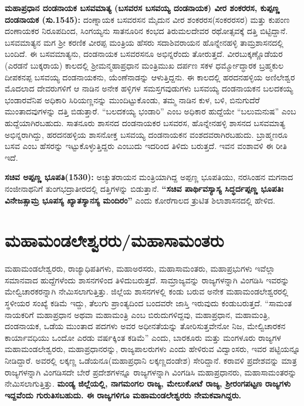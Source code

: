 \textbf{ಮಹಾಪ್ರಧಾನ ದಂಡನಾಯಕ ಬಸವಮಾತ್ಯ (ಬಸವರಸ \general{\enginline{-}} ಬಸವಯ್ಯ ದಂಡನಾಯಕ) ವೀರ ಶಂಕರರಸ, ಕುಪ್ಪಣ್ಣ ದಂಡನಾಯಕ (ಸು.1545):} ದಂಣ್ನಾಯಕ ಬಸವರಸನ ಮೈದುನ ವೀರ ಶಂಕರರಸ(ಸಂಕರರಸರ) ಮತ್ತು ಕುಪಂಣ ದಂಣಾಯಕರ ನಿರೂಪದಿಂದ, ಸಿಂಗಯ್ಯನು ಸಾತನೂರಿನ ಕಂಭದ ತಿರುಮಲದೇವರ ರಥೋತ್ಸವಕ್ಕೆ ದತ್ತಿ ಬಿಟ್ಟಿದ್ದಾನೆ. ಬಸವಮಾತ್ಯನ ಮಗ ಶ‍್ರೀ ಕರಣಿಕ ವೀರಪ್ಪ ಮಂತ್ರಿಯ ಹೆಸರು ಸದಾಶಿವರಾಯನ ಹೊನ್ನೇನಹಳ್ಳಿ ತಾಮ್ರಶಾಸನದಲ್ಲಿ ಬಂದಿದೆ. ಈ ಬಸವಮಾತ್ಯನು, ದಂಡನಾಯಕ ಬಸವರಸನೂ ಅಭಿನ್ನರೆಂದು ತೋರುತ್ತದೆ. ವೀರಬುಕ್ಕಣ್ಣೊಡೆಯರ (ಎರಡನೆ ಬುಕ್ಕರಾಯ) ಕಾಲದಲ್ಲಿ ಶ‍್ರೀಮನ್ಮಹಾಪ್ರಧಾನ ಮಂತ್ರಿಮುಖ ದರ್ಪಣ ಸಕಳ ಧರ್ಮ್ಮೋದ್ಧಾರಕ ಬ್ರಹ್ಮಕುಲ ದೀಪಕನಪ್ಪ ಬಸವಯ್ಯ ದಂಡನಾಯಕನು, ಯೆಂಣೆನಾಡನ್ನು ಆಳುತ್ತಿದ್ದನು. ಈ ಕಾಲದಲ್ಲಿ ಹರದನಹಳ್ಳಿಯ ಅಣಿಲೇಶ್ವರ ಮೊದಲಾದ ದೇವರುಗಳಿಗೆ ಆ ನಾಡಿನ ಅನೇಕ ಹಳ್ಳಿಗಳ ಸಮಸ್ತಗವುಡುಗಳು ಬಸವಯ್ಯ ದಂಡನಾಯಕನ ಬಲದಕಯ್ಯ ಭಂಡಾರವೆನಿಪ ಅಧಿಕಾರಿ ಸಿರಿಯಣ್ಣನನ್ನು ಮುಂದಿಟ್ಟುಕೊಂಡು, ತಮ್ಮ ನಾಡಿನ ಕುಳ, ಬಳಿ, ಬಿನುಗುದೆರೆ ಮುಂತಾದವುಗಳನ್ನು ದತ್ತಿ ಬಿಡುತ್ತಾರೆ. “ಬಲದಕಯ್ಯ ಭಂಡಾರಿ” ಎಂಬ ಅಧಿಕಾರ ಹುದ್ದೆಯೇ “ಬಲುಮನುಷ” ಎಂಬ ಹುದ್ದೆಯಾಗಿರಬಹುದು. ಸಾತನೂರು ಶಾಸನದ ದಂಡನಾಯಕರ ಬಸವರಸ, ಹೊನ್ನೇನಹಳ್ಳಿ ಶಾಸನದ ಬಸವಮಾತ್ಯ ಅಭಿನ್ನರಾಗಿದ್ದು, ಹರದನಹಳ್ಳಿಯ ಶಾಸನೋಕ್ತ ಬಸವಯ್ಯ ದಂಡನಾಯಕನ ವಂಶದವರಾಗಿರಬಹುದು. ಬ್ರಾಹ್ಮಣರೂ ಬಸವ ಎಂಬ ಹೆಸರನ್ನು ಇಟ್ಟುಕೊಳ್ಳುತ್ತಿದ್ದರು ಎಂಬುದು ಇದರಿಂದ ತಿಳಿದು ಬರುತ್ತದೆ. ಇವನ ವಂಶಾವಳಿ ಈ ರೀತಿ ಇದೆ.

\vskip -1pt

\textbf{ಸಚಿವ ಅಪ್ಪಣ್ಣ ಭೂಪತಿ(1530):} ಅಚ್ಯುತರಾಯನ ಮಂತ್ರಿಯಾಗಿದ್ದ ಅಪ್ಪಣ್ಣ ಭೂಪತಿಯು, ನರಸಿಂಹನ ಮಗನಾದ ನಂಜೀನಾಥನಿಗೆ ತುಂಗಭದ್ರಾತೀರದಲ್ಲಿ ದತ್ತಿಗಳನ್ನು ಬಿಡುತ್ತಾನೆ. \textbf{“ಸಚಿವ ಪಾರ್ಥಿವಸ್ಯಾಸ್ಯ ಸಿದ್ಧರ್ದಪ್ಪಣ್ಣ ಭೂಪತಿಃ ವಿನೇಜತ್ಸಾಮ್ರ ಭೂಪಸ್ಯ ಖ್ಯಾತಸ್ಯಾನಸ್ಯ ಮಂದಿರಂ”} ಎಂದು ಕೋರೆಗಾಲದ ತ್ರುಟಿತ ಶಿಲಾಶಾಸನದಲ್ಲಿ ಹೇಳಿದ.

\vskip -5pt

\section{ಮಹಾಮಂಡಲೇಶ್ವರರು/ಮಹಾಸಾಮಂತರು}

ಮಹಾಮಂಡಲೇಶ್ವರರು, ರಾಜ್ಯಾಧಿಪತಿಗಳು, ಮಹಾಅರಸರು, ಮಹಾಸಾಮಂತರು, ಮಹಾಪ್ರಭುಗಳು ಇವೆಲ್ಲಾ ಸಮಾನವಾದ ಹುದ್ದೆಗಳೆಂದು ಶಾಸನಗಳಿಂದ ತಿಳಿದುಬರುತ್ತದೆ. ಸಾಮ್ರಾಜ್ಯವನ್ನು ರಾಜ್ಯಗಳನ್ನಾಗಿ ವಿಂಗಡಿಸಿ ಇವರನ್ನು ಮೇಲ್ವಿಚಾರಕರನ್ನಾಗಿ ನೇಮಿಸಲಾಗುತ್ತಿತ್ತು. ಜಿಲ್ಲೆಯ ಶಾಸನಗಳಲ್ಲಿ ಕಂಡು ಬರುವ ಅನೇಕ ಮಹಾಮಂಡಲೇಶ್ವರರಲ್ಲಿ ಸ್ಥಳೀಯರ ಸಂಖ್ಯೆ ಕಡಿಮೆ ಇದ್ದು, ತೆಲುಗು ಪ್ರಾಂತ್ಯದಿಂದ ಬಂದವರೇ ಜಾಸ್ತಿ ಇರುವುದು ಕಂಡುಬರುತ್ತದೆ. “ಸಾಮಂತ ನಾಯಕರಿಗೆ ಮಹಾಪ್ರಧಾನ ಅಥವಾ ಮಹಾಮಂತ್ರಿ ಎಂಬ ಬಿರುದುಗಳಿದ್ದವು, ಮಹಾಪ್ರಧಾನ, ಮಹಾಮಂತ್ರಿ, ದಂಡನಾಯಕ, ಒಡೆಯ ಮುಂತಾದ ಪದಗಳು ಅವರ ಅಧೀನತೆಯನ್ನು ತೋರಿಸುತ್ತವೇನೋ ನಿಜ, ಮೇಲ್ವಿಚಾರಕನ ಕಾರ್ಯಾವಧಿಯು ಒಂದೋ ಎರಡು ವರ್ಷಕ್ಕಿಂತ ಕಡಿಮೆ” ಎಂದು, ಬಾರಕೂರು ಮತ್ತು ಮಂಗಳೂರು ರಾಜ್ಯಗಳ ಮಹಾಮಂಡಲೇಶ್ವರರು, ಮಹಾಪ್ರಧಾನರನ್ನು, ರಾಜ್ಯಪಾಲರುಗಳು ಎಂದು ಹೇಳಿರುವ ವಿದ್ವಾಂಸರು, ಇವರ ಪಟ್ಟಿಯನ್ನೂ ನೀಡಿದ್ದಾರೆ. ಅವರಲ್ಲಿ ಲಕ್ಕಣ್ಣ ಒಡೆಯನೂ(ಮಹಾಪ್ರಧಾನಿ ಲಕ್ಕಣ್ಣದಂಡೇಶ) ಸೇರಿದ್ದಾನೆ. ಕರಾವಳಿ ಪ್ರದೇಶವನ್ನು ಮಾತ್ರ ರಾಜ್ಯಗಳನ್ನಾಗಿ ವಿಂಗಡಿಸದೇ ಬೇರೆ ಪ್ರದೇಶಗಳನ್ನೂ ರಾಜ್ಯಗಳನ್ನಾಗಿ ವಿಂಗಡಿಸಿ ಮಹಾಪ್ರಧಾನರು, ಮಹಾಸಾಮಂತರನ್ನು ನೇಮಿಸಲಾಗುತ್ತಿತ್ತು. \textbf{ಮಂಡ್ಯ ಜಿಲ್ಲೆಯಲ್ಲಿ, ನಾಗಮಂಗಲ ರಾಜ್ಯ, ಮೇಲುಕೋಟೆ ರಾಜ್ಯ, ಶ‍್ರೀರಂಗಪಟ್ಟಣ ರಾಜ್ಯಗಳು ಇದ್ದವೆಂದು ಗುರುತಿಸಬಹುದು. ಈ ರಾಜ್ಯಗಳಿಗೂ ಮಹಾಮಂಡಲೇಶ್ವರರು ನೇಮಕವಾಗಿದ್ದರು.}

